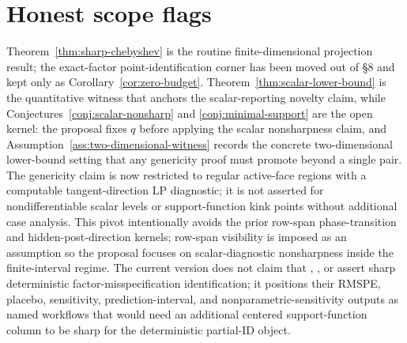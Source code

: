 \documentclass[11pt]{article}
\theoremstyle{definition}
\theoremstyle{plain}
\theoremstyle{remark}
\begin{document}
\section{Honest scope flags}
Theorem~\ref{thm:sharp-chebyshev} is the routine finite-dimensional projection result; the exact-factor point-identification corner has been moved out of §8 and kept only as Corollary~\ref{cor:zero-budget}. Theorem~\ref{thm:scalar-lower-bound} is the quantitative witness that anchors the scalar-reporting novelty claim, while Conjectures~\ref{conj:scalar-nonsharp} and \ref{conj:minimal-support} are the open kernel: the proposal fixes \(q\) before applying the scalar nonsharpness claim, and Assumption~\ref{ass:two-dimensional-witness} records the concrete two-dimensional lower-bound setting that any genericity proof must promote beyond a single pair. The genericity claim is now restricted to regular active-face regions with a computable tangent-direction LP diagnostic; it is not asserted for nondifferentiable scalar levels or support-function kink points without additional case analysis. This pivot intentionally avoids the prior row-span phase-transition and hidden-post-direction kernels; row-span visibility is imposed as an assumption so the proposal focuses on scalar-diagnostic nonsharpness inside the finite-interval regime. The current version does not claim that \citet{FirpoPossebom2018}, \citet{CattaneoFengTitiunik2021}, or \citet{ZeitlerVlontzosGilliganLee2023} assert sharp deterministic factor-misspecification identification; it positions their RMSPE, placebo, sensitivity, prediction-interval, and nonparametric-sensitivity outputs as named workflows that would need an additional centered support-function column to be sharp for the deterministic partial-ID object.
\end{document}

